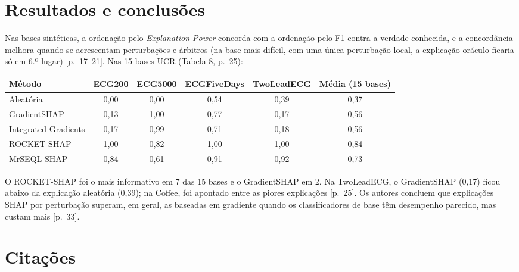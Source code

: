 \documentclass[11pt,a4paper]{article}
\begin{document}
\section{Resultados e conclusões}
Nas bases sintéticas, a ordenação pelo \textit{Explanation Power} concorda com a ordenação pelo F1 contra a verdade conhecida, e a concordância melhora quando se acrescentam perturbações e árbitros (na base mais difícil, com uma única perturbação local, a explicação oráculo ficaria só em 6.º lugar) [p.~17--21]. Nas 15 bases UCR (Tabela 8, p.~25):
\begin{center}\small
\begin{tabular}{lccccc}
\toprule
\textbf{Método} & \textbf{ECG200} & \textbf{ECG5000} & \textbf{ECGFiveDays} & \textbf{TwoLeadECG} & \textbf{Média (15 bases)} \\
\midrule
Aleatória & 0,00 & 0,00 & 0,54 & 0,39 & 0,37 \\
GradientSHAP & 0,13 & 1,00 & 0,77 & 0,17 & 0,56 \\
Integrated Gradients & 0,17 & 0,99 & 0,71 & 0,18 & 0,56 \\
ROCKET-SHAP & 1,00 & 0,82 & 1,00 & 1,00 & 0,84 \\
MrSEQL-SHAP & 0,84 & 0,61 & 0,91 & 0,92 & 0,73 \\
\bottomrule
\end{tabular}
\end{center}
O ROCKET-SHAP foi o mais informativo em 7 das 15 bases e o GradientSHAP em 2. Na TwoLeadECG, o GradientSHAP (0,17) ficou abaixo da explicação aleatória (0,39); na Coffee, foi apontado entre as piores explicações [p.~25]. Os autores concluem que explicações SHAP por perturbação superam, em geral, as baseadas em gradiente quando os classificadores de base têm desempenho parecido, mas custam mais [p.~33].

\section{Citações}
\end{document}
